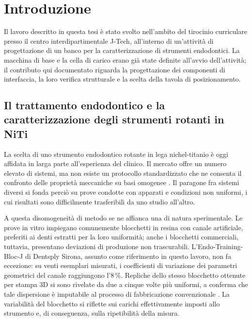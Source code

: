 \chapter{Introduzione}
\label{cap:introduzione}

Il lavoro descritto in questa tesi è stato svolto nell'ambito del tirocinio
curriculare presso il centro interdipartimentale J-Tech, all'interno di
un'attività di progettazione di un banco per la caratterizzazione di strumenti
endodontici. La macchina di base e la cella di carico erano già state definite
all'avvio dell'attività; il contributo qui documentato riguarda la progettazione
dei componenti di interfaccia, la loro verifica strutturale e la scelta della
tavola di posizionamento.

\section{Il trattamento endodontico e la caratterizzazione degli strumenti rotanti in NiTi}

La scelta di uno strumento endodontico rotante in lega nichel-titanio è oggi
affidata in larga parte all'esperienza del clinico. Il mercato offre un numero
elevato di sistemi, ma non esiste un protocollo
standardizzato che ne consenta il confronto delle proprietà meccaniche su basi
omogenee \cite{smutny2022}. Il paragone fra sistemi diversi si fonda perciò su
prove condotte con apparati e condizioni non uniformi, i cui risultati sono
difficilmente trasferibili da uno studio all'altro.

A questa disomogeneità di metodo se ne affianca una di natura sperimentale. Le
prove in vitro impiegano comunemente blocchetti in resina con canale artificiale,
preferiti ai denti estratti per la loro uniformità; anche i blocchetti
commerciali, tuttavia, presentano deviazioni di produzione non trascurabili.
L'Endo-Training-Bloc-J di Dentsply Sirona, assunto come riferimento in questo
lavoro, non fa eccezione: su venti esemplari misurati, i coefficienti di
variazione dei parametri geometrici del canale raggiungono l'8\,\%. Repliche
dello stesso blocchetto ottenute per stampa 3D si sono rivelate da due a cinque
volte più uniformi, a conferma che tale dispersione è imputabile al processo di
fabbricazione convenzionale \cite{smutny2022}. La variabilità del blocchetto si
riflette sui carichi effettivamente imposti allo strumento e, di conseguenza,
sulla ripetibilità della misura.


